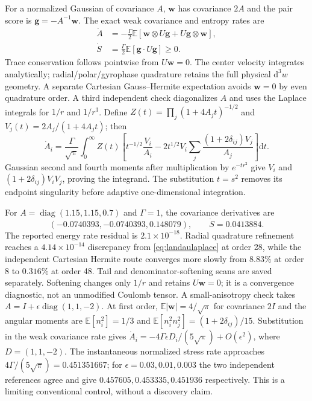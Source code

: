 \documentclass[11pt,letterpaper]{article}
\newcommand{\dd}{\mathrm d}
\newcommand{\diag}{\operatorname{diag}}
\begin{document}
For a normalized Gaussian of covariance $A$, $\bm w$ has covariance $2A$ and
the pair score is $\bm g=-A^{-1}\bm w$. The exact weak covariance and entropy
rates are
\begin{align}
 \dot A&=-\frac\Gamma2\mathbb E[
   \bm w\otimes U\bm g+U\bm g\otimes\bm w],\\
 \dot S&=\frac\Gamma2\mathbb E[\bm g\cdot U\bm g]\ge0.
\end{align}
Trace conservation follows pointwise from $U\bm w=0$.
The center velocity integrates analytically; radial/polar/gyrophase quadrature
retains the full physical $\dd^3w$ geometry. A separate Cartesian Gauss--Hermite
expectation avoids $\bm w=0$ by even quadrature order.
A third independent check diagonalizes $A$ and uses the Laplace integrals for
$1/r$ and $1/r^3$. Define
$Z(t)=\prod_j(1+4A_jt)^{-1/2}$ and $V_j(t)=2A_j/(1+4A_jt)$; then
\begin{equation}
 \dot A_i=\frac\Gamma{\sqrt\pi}\int_0^\infty Z(t)
 \left[t^{-1/2}\frac{V_i}{A_i}
 -2t^{1/2}V_i\sum_j\frac{(1+2\delta_{ij})V_j}{A_j}\right]\dd t.
 \label{eq:landaulaplace}
\end{equation}
Gaussian second and fourth moments after multiplication by $e^{-tr^2}$ give
$V_i$ and $(1+2\delta_{ij})V_iV_j$, proving the integrand.
The substitution $t=s^2$ removes its endpoint singularity before adaptive
one-dimensional integration.

For $A=\diag(1.15,1.15,0.7)$ and $\Gamma=1$, the covariance derivatives are
\[(-0.0740393,-0.0740393,0.148079),\qquad \dot S=0.0413884.\]
The reported energy
rate residual is $2.1\times10^{-18}$. Radial quadrature refinement reaches a
$4.14\times10^{-14}$ discrepancy from \eqref{eq:landaulaplace} at order 28,
while the independent Cartesian Hermite route converges more slowly from
$8.83\%$ at order 8 to $0.316\%$ at order 48. Tail and denominator-softening
scans are saved separately. Softening changes only $1/r$ and retains $U\bm w=0$;
it is a convergence diagnostic, not an unmodified Coulomb tensor.
A small-anisotropy check takes $A=I+\epsilon\diag(1,1,-2)$.
At first order, $\mathbb E|\bm w|=4/\sqrt\pi$ for covariance $2I$ and the
angular moments are
$\mathbb E[n_i^2]=1/3$ and
$\mathbb E[n_i^2n_j^2]=(1+2\delta_{ij})/15$.
Substitution in the weak covariance rate gives
$\dot A_i=-4\Gamma\epsilon D_i/(5\sqrt\pi)+O(\epsilon^2)$,
where $D=(1,1,-2)$. The instantaneous normalized stress rate approaches
$4\Gamma/(5\sqrt\pi)=0.451351667$; for $\epsilon=0.03,0.01,0.003$ the two
independent references agree and give $0.457605,0.453335,0.451936$ respectively.
This is a limiting conventional control, without a discovery claim.
\end{document}
